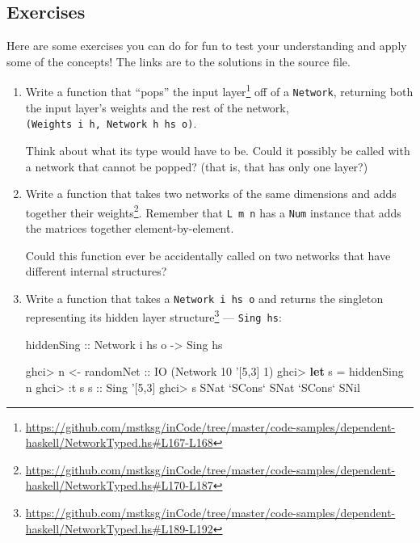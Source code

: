 \documentclass[]{article}
\newenvironment{Shaded}{}{}
\newcommand{\DataTypeTok}[1]{\textcolor[rgb]{0.56,0.13,0.00}{#1}}
\newcommand{\DecValTok}[1]{\textcolor[rgb]{0.25,0.63,0.44}{#1}}
\newcommand{\FunctionTok}[1]{\textcolor[rgb]{0.02,0.16,0.49}{#1}}
\newcommand{\KeywordTok}[1]{\textcolor[rgb]{0.00,0.44,0.13}{\textbf{#1}}}
\newcommand{\NormalTok}[1]{#1}
\newcommand{\OtherTok}[1]{\textcolor[rgb]{0.00,0.44,0.13}{#1}}
\renewcommand{\href}[2]{#2\footnote{\url{#1}}}
\begin{document}
\hypertarget{exercises}{%
\subsection{Exercises}\label{exercises}}

Here are some exercises you can do for fun to test your understanding and apply
some of the concepts! The links are to the solutions in the source file.

\begin{enumerate}
\def\labelenumi{\arabic{enumi}.}
\item
  Write a function that
  \href{https://github.com/mstksg/inCode/tree/master/code-samples/dependent-haskell/NetworkTyped.hs\#L167-L168}{``pops''
  the input layer} off of a \texttt{Network}, returning both the input layer's
  weights and the rest of the network,
  \texttt{(Weights\ i\ h,\ Network\ h\ hs\ o)}.

  Think about what its type would have to be. Could it possibly be called with a
  network that cannot be popped? (that is, that has only one layer?)
\item
  Write a
  \href{https://github.com/mstksg/inCode/tree/master/code-samples/dependent-haskell/NetworkTyped.hs\#L170-L187}{function
  that takes two networks of the same dimensions and adds together their
  weights}. Remember that \texttt{L\ m\ n} has a \texttt{Num} instance that adds
  the matrices together element-by-element.

  Could this function ever be accidentally called on two networks that have
  different internal structures?
\item
  Write a function that takes a \texttt{Network\ i\ hs\ o} and
  \href{https://github.com/mstksg/inCode/tree/master/code-samples/dependent-haskell/NetworkTyped.hs\#L189-L192}{returns
  the singleton representing its hidden layer structure} --- \texttt{Sing\ hs}:

\begin{Shaded}
\begin{Highlighting}[]
\OtherTok{hiddenSing ::} \DataTypeTok{Network}\NormalTok{ i hs o }\OtherTok{->} \DataTypeTok{Sing}\NormalTok{ hs}
\end{Highlighting}
\end{Shaded}

\begin{Shaded}
\begin{Highlighting}[]
\NormalTok{ghci}\FunctionTok{>}\NormalTok{ n }\OtherTok{<- randomNet ::} \DataTypeTok{IO}\NormalTok{ (}\DataTypeTok{Network} \DecValTok{10}\NormalTok{ '[}\DecValTok{5}\NormalTok{,}\DecValTok{3}\NormalTok{] }\DecValTok{1}\NormalTok{)}
\NormalTok{ghci}\FunctionTok{>} \KeywordTok{let}\NormalTok{ s }\FunctionTok{=}\NormalTok{ hiddenSing n}
\NormalTok{ghci}\FunctionTok{>} \FunctionTok{:}\NormalTok{t s}
\OtherTok{s ::} \DataTypeTok{Sing}\NormalTok{ '[}\DecValTok{5}\NormalTok{,}\DecValTok{3}\NormalTok{]}
\NormalTok{ghci}\FunctionTok{>}\NormalTok{ s}
\DataTypeTok{SNat} \OtherTok{`SCons`} \DataTypeTok{SNat} \OtherTok{`SCons`} \DataTypeTok{SNil}
\end{Highlighting}
\end{Shaded}
\end{enumerate}
\end{document}
